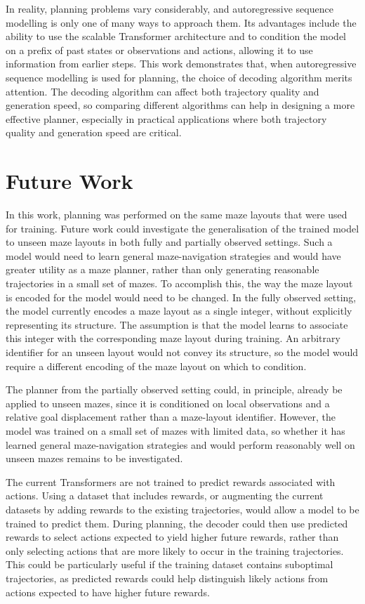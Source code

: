 ﻿\documentclass[12pt,a4paper]{article}
\theoremstyle{definition}
\begin{document}
In reality, planning problems vary considerably, and autoregressive sequence modelling is only one of many ways
to approach them. Its advantages include the ability to use the scalable Transformer architecture
and to condition the model on a prefix of past states or observations and actions, allowing it to use
information from earlier steps. This work demonstrates that, when autoregressive sequence modelling
is used for planning, the choice of decoding algorithm merits attention. The decoding algorithm can
affect both trajectory quality and generation speed, so comparing different algorithms can help in
designing a more effective planner, especially in practical applications where both trajectory quality and 
generation speed are critical.


\section{Future Work}

In this work, planning was performed on the same maze layouts that were used for training. Future work could
investigate the generalisation of the trained model to unseen maze layouts in both fully and partially observed settings.
Such a model would need to learn general maze-navigation strategies and would have greater utility as a
maze planner, rather than only generating reasonable trajectories in a small set of mazes.
To accomplish this, the way the maze layout is encoded for the model would need to be changed.
In the fully observed setting, the model currently
encodes a maze layout as a single integer, without explicitly representing its structure.
The assumption is that the model learns to associate this integer with the corresponding maze layout during training.
An arbitrary identifier for an unseen layout would not convey its structure, so the model would require a different
encoding of the maze layout on which to condition.

The planner from the partially observed setting could, in principle, already be applied to unseen mazes,
since it is conditioned on local observations and a relative goal displacement rather than a maze-layout identifier.
However, the model was trained on a small set of mazes with limited data, so whether it has
learned general maze-navigation strategies and would perform reasonably well on unseen mazes
remains to be investigated.

The current Transformers are not trained to predict rewards associated with actions. Using
a dataset that includes rewards, or augmenting the current datasets by adding rewards to the
existing trajectories, would allow a model to be trained to predict them. During planning, the
decoder could then use predicted rewards to select actions expected to yield higher future rewards,
rather than only selecting actions that are more likely to occur in the training trajectories.
This could be particularly useful if the training dataset contains suboptimal trajectories,
as predicted rewards could help distinguish likely actions from actions expected to have higher
future rewards.
\end{document}

